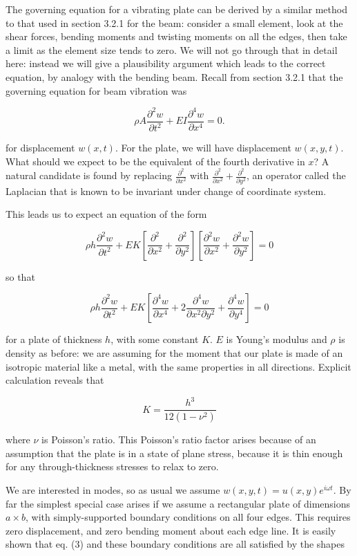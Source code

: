   The governing equation for a vibrating plate can be derived by a similar 
  method to that used in section 3.2.1 for the beam: consider a small element, 
  look at the shear forces, bending moments and twisting moments on all the 
  edges, then take a limit as the element size tends to zero. We will not go 
  through that in detail here: instead we will give a plausibility argument 
  which leads to the correct equation, by analogy with the bending beam. Recall 
  from section 3.2.1 that the governing equation for beam vibration was 

  $$\rho A \dfrac{\partial^2 w}{\partial t^2}+EI \dfrac{\partial^4 w}{\partial 
  x^4}=0. \tag{1}$$ 

  for displacement $w(x,t)$. For the plate, we will have displacement 
  $w(x,y,t)$. What should we expect to be the equivalent of the fourth 
  derivative in $x$? A natural candidate is found by replacing 
  $\frac{\partial^2}{\partial x^2}$ with $\frac{\partial^2}{\partial 
  x^2}+\frac{\partial^2}{\partial y^2}$, an operator called the Laplacian that 
  is known to be invariant under change of coordinate system. 

  This leads us to expect an equation of the form 

  $$\rho h \dfrac{\partial^2 w}{\partial t^2}+EK 
  \left[\frac{\partial^2}{\partial x^2}+\frac{\partial^2}{\partial y^2} \right] 
  \left[\dfrac{\partial^2 w}{\partial x^2}+\dfrac{\partial^2 w}{\partial 
  y^2}\right]=0\tag{2}$$ 

  so that 

  $$\rho h \dfrac{\partial^2 w}{\partial t^2}+EK \left[\frac{\partial^4 
  w}{\partial x^4}+2\frac{\partial^4 w}{\partial x^2 \partial y^2} 
  +\frac{\partial^4 w}{\partial y^4} \right]=0\tag{3}$$ 

  for a plate of thickness $h$, with some constant $K$. $E$ is Young's modulus 
  and $\rho$ is density as before: we are assuming for the moment that our 
  plate is made of an isotropic material like a metal, with the same properties 
  in all directions. Explicit calculation reveals that 

  $$K=\frac{h^3}{12(1-\nu^2)} \tag{4}$$ 

  where $\nu$ is Poisson's ratio. This Poisson's ratio factor arises because of 
  an assumption that the plate is in a state of plane stress, because it is 
  thin enough for any through-thickness stresses to relax to zero. 

  We are interested in modes, so as usual we assume $w(x,y,t)=u(x,y) e^{i 
  \omega t}$. By far the simplest special case arises if we assume a 
  rectangular plate of dimensions $a \times b$, with simply-supported boundary 
  conditions on all four edges. This requires zero displacement, and zero 
  bending moment about each edge line. It is easily shown that eq. (3) and 
  these boundary conditions are all satisfied by the shapes 

